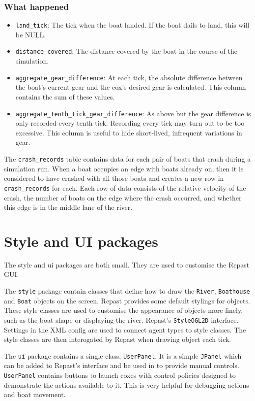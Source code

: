 {\subsubsection{What happened}
\begin{itemize}
  \item{\texttt{land\_tick}:} The tick when the boat landed. If the boat dails
    to land, this will be NULL.
  \item{\texttt{distance\_covered}:} The distance covered by the boat in the
    course of the simulation.
  \item{\texttt{aggregate\_gear\_difference}:} At each tick, the absolute
    difference between the boat's current gear and the cox's desired
    gear is calculated. This column contains the sum of these values.
  \item{\texttt{aggregate\_tenth\_tick\_gear\_difference}:} As above but the
    gear difference is only recorded every tenth tick. Recording every
    tick may turn out to be too excessive. This column is useful to
    hide short-lived, infrequent variations in gear.
\end{itemize}

The \texttt{crash\_records} table contains data for each pair of boats that crash during a simulation run. When a boat occupies an edge with boats already on, then it is considered to have crashed with all those boats and creates a new row in \texttt{crash\_records} for each. Each row of data consists of the relative velocity of the crash, the number of boats on the edge where the crash occurred, and whether this edge is in the middle lane of the river.

\section{Style and UI packages}
The style and ui packages are both small. They are used to customise the Repast
GUI. 

The \texttt{style} package contain classes
that define how to draw the \texttt{River}, \texttt{Boathouse} and \texttt{Boat} objects on the
screen. Repast provides some default stylings for objects. These style
classes are used to customise the appearance of objects more finely,
such as the boat shape or displaying the river.
Repast's \texttt{StyleOGL2D} interface. Settings in the XML config are used to
connect agent types to style classes. The style classes are then
interogated by Repast when drawing object each tick.

The \texttt{ui} package contains a single class, \texttt{UserPanel}. It is a simple \texttt{JPanel} which
can be added to Repast's interface and be used in to provide manual
controls. \texttt{UserPanel} contains buttons to launch coxes with control
policies designed to demonstrate the actions available to it. This is
very helpful for debugging actions and boat movement.

}
